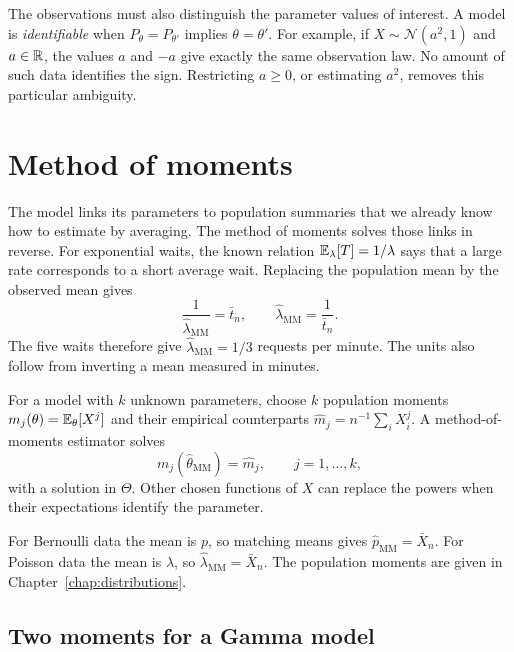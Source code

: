 The observations must also distinguish the parameter values of interest.
A model is \emph{identifiable} when \(P_\theta=P_{\theta'}\) implies
\(\theta=\theta'\). For example, if \(X\sim\mathcal N(a^2,1)\) and
\(a\in\mathbb{R}\), the values \(a\) and \(-a\) give exactly the same
observation law. No amount of such data identifies the sign. Restricting
\(a\ge0\), or estimating \(a^2\), removes this particular ambiguity.

\section{Method of moments}
\label{sec:method-moments}

The model links its parameters to population summaries that we already know
how to estimate by averaging. The method of moments solves those links in
reverse. For exponential waits, the known relation
\(\mathbb{E}_\lambda[T]=1/\lambda\) says that a large rate corresponds to a
short average wait. Replacing the population mean by the observed mean gives
\[
  \frac1{\widehat\lambda_{\mathrm{MM}}}=\bar t_n,
  \qquad \widehat\lambda_{\mathrm{MM}}=\frac1{\bar t_n}.
\]
The five waits therefore give \(\widehat\lambda_{\mathrm{MM}}=1/3\)
requests per minute. The units also follow from inverting a mean measured
in minutes.

\begin{definition}
For a model with \(k\) unknown parameters, choose \(k\) population moments
\(m_j(\theta)=\mathbb{E}_\theta[X^j]\) and their empirical counterparts
\(\widehat m_j=n^{-1}\sum_i X_i^j\). A method-of-moments estimator solves
\[
  m_j(\widehat\theta_{\mathrm{MM}})=\widehat m_j,
  \qquad j=1,\ldots,k,
\]
with a solution in \(\Theta\). Other chosen functions of \(X\) can replace
the powers when their expectations identify the parameter.
\end{definition}

For Bernoulli data the mean is \(p\), so matching means gives
\(\widehat p_{\mathrm{MM}}=\bar X_n\). For Poisson data the mean is
\(\lambda\), so \(\widehat\lambda_{\mathrm{MM}}=\bar X_n\).
The population moments are given in Chapter~\ref{chap:distributions}.

\subsection{Two moments for a Gamma model}

